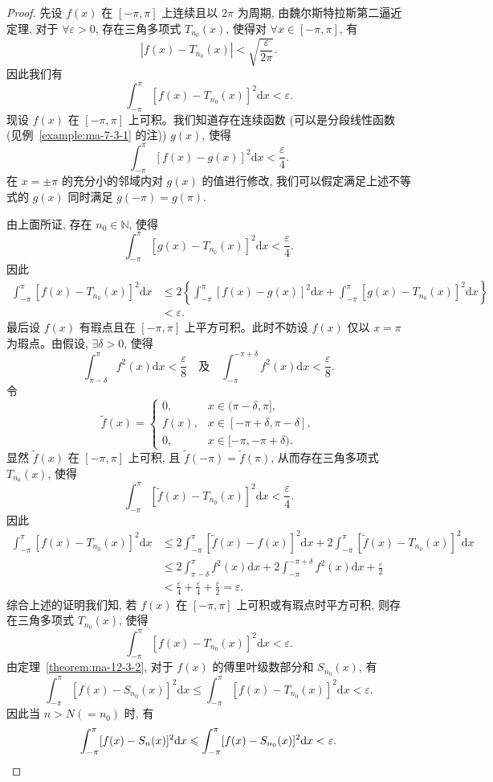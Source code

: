\begin{proof}
先设 $f(x)$ 在 $[-\pi,\pi]$ 上连续且以 $2\pi$ 为周期, 由魏尔斯特拉斯第二逼近定理, 对于 $\forall\varepsilon>0$, 存在三角多项式 $T_{n_0}(x)$, 使得对 $\forall x\in[-\pi,\pi]$, 有
\[
  |f(x)-T_{n_0}(x)|<\sqrt{\frac{\varepsilon}{2\pi}}.
\]
因此我们有
\[
  \int_{-\pi}^{\pi}[f(x)-T_{n_0}(x)]^2\mathrm dx<\varepsilon.
\]
现设 $f(x)$ 在 $[-\pi,\pi]$ 上可积。我们知道存在连续函数 (可以是分段线性函数 (见例~\ref{example:ma-7-3-1} 的注)) $g(x)$, 使得
\[
  \int_{-\pi}^{\pi}[f(x)-g(x)]^2\mathrm dx<\frac{\varepsilon}{4}.
\]
在 $x=\pm\pi$ 的充分小的邻域内对 $g(x)$ 的值进行修改, 我们可以假定满足上述不等式的 $g(x)$ 同时满足 $g(-\pi)=g(\pi)$.

由上面所证, 存在 $n_0\in\mathbb N$, 使得
\[
  \int_{-\pi}^{\pi}[g(x)-T_{n_0}(x)]^2\mathrm dx<\frac{\varepsilon}{4}.
\]
因此
\[
\begin{aligned}
  \int_{-\pi}^{\pi}[f(x)-T_{n_0}(x)]^2\mathrm dx
  &\leqslant
  2\left\{
    \int_{-\pi}^{\pi}[f(x)-g(x)]^2\mathrm dx
    +\int_{-\pi}^{\pi}[g(x)-T_{n_0}(x)]^2\mathrm dx
  \right\}\\
  &<\varepsilon.
\end{aligned}
\]
最后设 $f(x)$ 有瑕点且在 $[-\pi,\pi]$ 上平方可积。此时不妨设 $f(x)$ 仅以 $x=\pi$ 为瑕点。由假设, $\exists\delta>0$, 使得
\[
  \int_{\pi-\delta}^{\pi}f^2(x)\mathrm dx<\frac{\varepsilon}{8}
  \quad\text{及}\quad
  \int_{-\pi}^{-\pi+\delta}f^2(x)\mathrm dx<\frac{\varepsilon}{8}.
\]
令
\[
  \widetilde f(x)=
  \begin{cases}
    0, & x\in(\pi-\delta,\pi],\\
    f(x), & x\in[-\pi+\delta,\pi-\delta],\\
    0, & x\in[-\pi,-\pi+\delta).
  \end{cases}
\]
显然 $\widetilde f(x)$ 在 $[-\pi,\pi]$ 上可积, 且 $\widetilde f(-\pi)=\widetilde f(\pi)$, 从而存在三角多项式 $T_{n_0}(x)$, 使得
\[
  \int_{-\pi}^{\pi}[\widetilde f(x)-T_{n_0}(x)]^2\mathrm dx<\frac{\varepsilon}{4}.
\]
因此
\[
\begin{aligned}
  \int_{-\pi}^{\pi}[f(x)-T_{n_0}(x)]^2\mathrm dx
  &\leqslant
  2\int_{-\pi}^{\pi}[\widetilde f(x)-f(x)]^2\mathrm dx
  +2\int_{-\pi}^{\pi}[\widetilde f(x)-T_{n_0}(x)]^2\mathrm dx\\
  &\leqslant
  2\int_{\pi-\delta}^{\pi}f^2(x)\mathrm dx
  +2\int_{-\pi}^{-\pi+\delta}f^2(x)\mathrm dx
  +\frac{\varepsilon}{2}\\
  &<\frac{\varepsilon}{4}+\frac{\varepsilon}{4}+\frac{\varepsilon}{2}
  =\varepsilon.
\end{aligned}
\]
综合上述的证明我们知, 若 $f(x)$ 在 $[-\pi,\pi]$ 上可积或有瑕点时平方可积, 则存在三角多项式 $T_{n_0}(x)$, 使得
\[
  \int_{-\pi}^{\pi}[f(x)-T_{n_0}(x)]^2\mathrm dx<\varepsilon.
\]
由定理~\ref{theorem:ma-12-3-2}, 对于 $f(x)$ 的傅里叶级数部分和 $S_{n_0}(x)$, 有
\[
  \int_{-\pi}^{\pi}[f(x)-S_{n_0}(x)]^2\mathrm dx
  \leqslant
  \int_{-\pi}^{\pi}[f(x)-T_{n_0}(x)]^2\mathrm dx<\varepsilon.
\]
因此当 $n>N(=n_0)$ 时, 有
\[
  \int_{-\pi}^{\pi}[f(x)-S_n(x)]^2\mathrm dx
  \leqslant
  \int_{-\pi}^{\pi}[f(x)-S_{n_0}(x)]^2\mathrm dx<\varepsilon.
\qedhere
\]
\end{proof}


